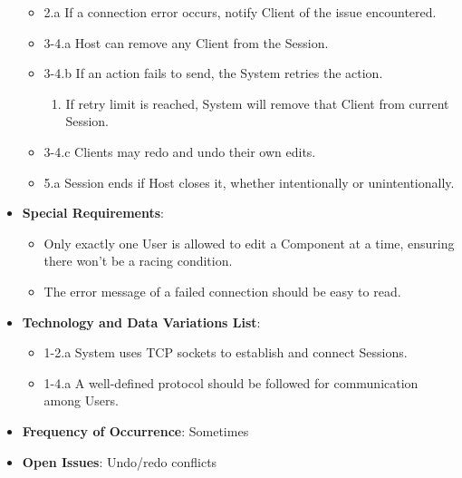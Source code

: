 \documentclass[12pt]{article}
\begin{document}
\begin{itemize}
\begin{itemize}
            \item 2.a If a connection error occurs, notify Client of the issue encountered.
            \item 3-4.a Host can remove any Client from the Session.
            \item 3-4.b If an action fails to send, the System retries the action.
            \begin{enumerate}
                \item If retry limit is reached, System will remove that Client from current Session.
            \end{enumerate}
            \item 3-4.c Clients may redo and undo their own edits.
            \item 5.a Session ends if Host closes it, whether intentionally or unintentionally.
        \end{itemize}
        \item \textbf{Special Requirements}:
        \begin{itemize}
            \item Only exactly one User is allowed to edit a Component at a time, ensuring there won't be a racing condition.
            \item The error message of a failed connection should be easy to read.
        \end{itemize}
        \item \textbf{Technology and Data Variations List}:
            \begin{itemize}
                \item 1-2.a System uses TCP sockets to establish and connect Sessions.
                \item 1-4.a A well-defined protocol should be followed for communication among Users.
            \end{itemize}
        \item \textbf{Frequency of Occurrence}: Sometimes
        \item \textbf{Open Issues}: Undo/redo conflicts
    \end{itemize}
\end{document}
